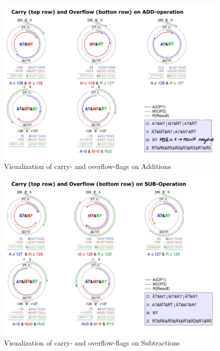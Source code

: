 \documentclass[a4paper, 11pt, nofootinbib]{article}
\begin{document}
\begin{figure}[htb]
	\centering
	\includegraphics[keepaspectratio=true,height=19\baselineskip]{flags_add.PNG}
	\caption{Visualization of carry- and overflow-flags on Additions}
	\label{fig:flags_add}
\end{figure}

\restoregeometry
\newpage

\begin{figure}[htb]
	\centering
	\includegraphics[keepaspectratio=true,height=20\baselineskip]{flags_sub.PNG}
	\caption{Visualization of carry- and overflow-flags on Subtractions}
	\label{fig:flags_sub}
\end{figure}
\end{document}
